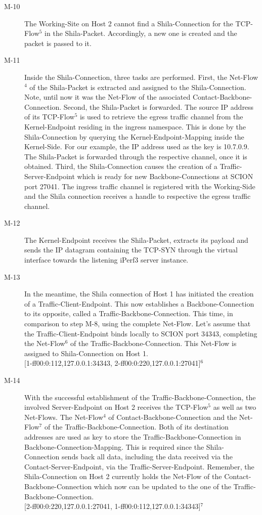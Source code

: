 \begin{description}
	\item[M-10] The Working-Site on Host 2 cannot find a Shila-Connection for the TCP-Flow$^{5}$ in the Shila-Packet. Accordingly, a new one is created and the packet is passed to it.
	\item[M-11] Inside the Shila-Connection, three tasks are performed. First, the Net-Flow$^{4}$ of the Shila-Packet is extracted and assigned to the Shila-Connection.  Note, until now it was the Net-Flow of the associated Contact-Backbone-Connection. Second, the Shila-Packet is forwarded. The source IP address of its TCP-Flow$^{5}$ is used to retrieve the egress traffic channel from the Kernel-Endpoint residing in the ingress namespace. This is done by the Shila-Connection by querying the Kernel-Endpoint-Mapping inside the Kernel-Side. For our example, the IP address used as the key is 10.7.0.9. The Shila-Packet is forwarded through the respective channel, once it is obtained. Third, the Shila-Connection causes the creation of a Traffic-Server-Endpoint which is ready for new Backbone-Connections at SCION port 27041. The ingress traffic channel is registered with the Working-Side and the Shila connection receives a handle to respective the egress traffic channel.
	\item[M-12] The Kernel-Endpoint receives the Shila-Packet, extracts its payload and sends the IP datagram containing the TCP-SYN through the virtual interface towards the listening iPerf3 server instance.
	\item[M-13] In the meantime, the Shila connection of Host 1 has initiated the creation of a Traffic-Client-Endpoint. This now establishes a Backbone-Connection to its opposite, called a Traffic-Backbone-Connection. This time, in comparison to step M-8, using the complete Net-Flow. Let's assume that the Traffic-Client-Endpoint binds locally to SCION port 34343, completing the Net-Flow$^{6}$ of the Traffic-Backbone-Connection. This Net-Flow is assigned to Shila-Connection on Host 1.
	\medskip\\{\small [1-ff00:0:112,127.0.0.1:34343, 2-ff00:0:220,127.0.0.1:27041]$^{6}$}
	\item[M-14] With the successful establishment of the Traffic-Backbone-Connection, the involved Server-Endpoint on Host 2 receives the TCP-Flow$^{5}$ as well as two Net-Flows. The Net-Flow$^{4}$ of Contact-Backbone-Connection and the Net-Flow$^{7}$ of the Traffic-Backbone-Connection. Both of its destination addresses are used as key to store the Traffic-Backbone-Connection in Backbone-Connection-Mapping. This is required since the Shila-Connection sends back all data, including the data received via the Contact-Server-Endpoint, via the Traffic-Server-Endpoint. Remember, the Shila-Connection on Host 2 currently holds the Net-Flow of the Contact-Backbone-Connection which now can be updated to the one of the Traffic-Backbone-Connection.\medskip\\{\small [2-ff00:0:220,127.0.0.1:27041, 1-ff00:0:112,127.0.0.1:34343]$^{7}$}
\end{description}	
